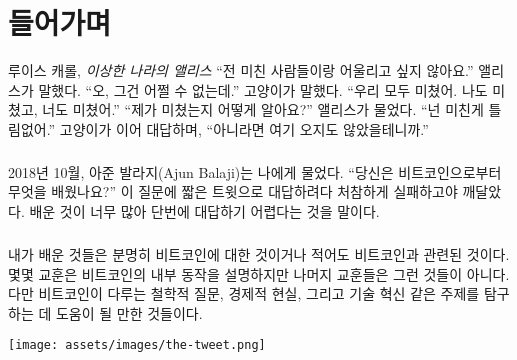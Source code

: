 \chapter*{들어가며}
\label{ch:introduction}

\begin{chapquote}{루이스 캐롤, \textit{이상한 나라의 앨리스}}
	\enquote{전 미친 사람들이랑 어울리고 싶지 않아요.} 앨리스가 말했다. 
	\enquote{오, 그건 어쩔 수 없는데.}  고양이가 말했다. 
	\enquote{우리 모두 미쳤어. 나도 미쳤고, 너도 미쳤어.} 
	\enquote{제가 미쳤는지 어떻게 알아요?} 앨리스가 물었다. 
	\enquote{넌 미친게 틀림없어.} 고양이가 이어 대답하며, 
	\enquote{아니라면 여기 오지도 않았을테니까.}
\end{chapquote}


\paragraph{}
2018년 10월, 아준 발라지(Ajun Balaji)는 나에게 물었다.
\enquote{당신은 비트코인으로부터 무엇을 배웠나요?} 이 질문에 짧은 트윗으로 대답하려다 처참하게 실패하고야 깨달았다.
배운 것이 너무 많아 단번에 대답하기 어렵다는 것을 말이다.

\paragraph{}
내가 배운 것들은 분명히 비트코인에 대한 것이거나 적어도 비트코인과 관련된 것이다. 
몇몇 교훈은 비트코인의 내부 동작을 설명하지만 나머지 교훈들은 그런 것들이 아니다.
다만 비트코인이 다루는 철학적 질문, 경제적 현실, 그리고 기술 혁신 같은 주제를 탐구하는 데 도움이 될 만한 것들이다. 

\begin{center}
	\texttt{[image: assets/images/the-tweet.png]}
\end{center}

